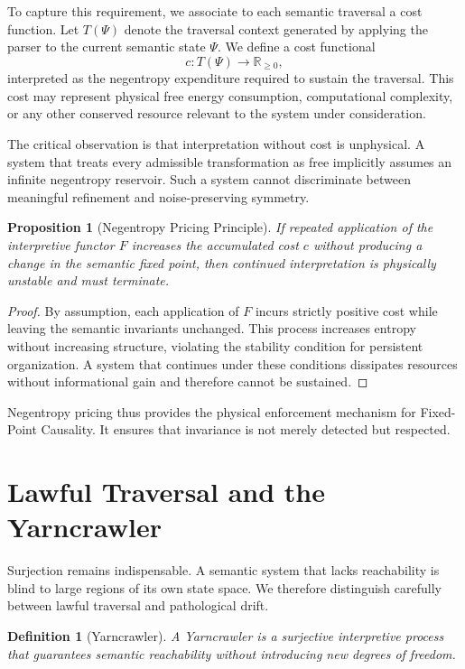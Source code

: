 \documentclass[12pt]{article}
\newtheorem{definition}[theorem]{Definition}
\newtheorem{proposition}[theorem]{Proposition}
\theoremstyle{remark}
\begin{document}
To capture this requirement, we associate to each semantic traversal a cost function. Let $T(\Psi)$ denote the traversal context generated by applying the parser to the current semantic state $\Psi$. We define a cost functional
\[
c : T(\Psi) \to \mathbb{R}_{\ge 0},
\]
interpreted as the negentropy expenditure required to sustain the traversal. This cost may represent physical free energy consumption, computational complexity, or any other conserved resource relevant to the system under consideration.

The critical observation is that interpretation without cost is unphysical. A system that treats every admissible transformation as free implicitly assumes an infinite negentropy reservoir. Such a system cannot discriminate between meaningful refinement and noise-preserving symmetry.

\begin{proposition}[Negentropy Pricing Principle]
If repeated application of the interpretive functor $F$ increases the accumulated cost $c$ without producing a change in the semantic fixed point, then continued interpretation is physically unstable and must terminate.
\end{proposition}

\begin{proof}
By assumption, each application of $F$ incurs strictly positive cost while leaving the semantic invariants unchanged. This process increases entropy without increasing structure, violating the stability condition for persistent organization. A system that continues under these conditions dissipates resources without informational gain and therefore cannot be sustained.
\end{proof}

Negentropy pricing thus provides the physical enforcement mechanism for Fixed-Point Causality. It ensures that invariance is not merely detected but respected.

\section{Lawful Traversal and the Yarncrawler}

Surjection remains indispensable. A semantic system that lacks reachability is blind to large regions of its own state space. We therefore distinguish carefully between lawful traversal and pathological drift.

\begin{definition}[Yarncrawler]
A Yarncrawler is a surjective interpretive process that guarantees semantic reachability without introducing new degrees of freedom.
\end{definition}
\end{document}
